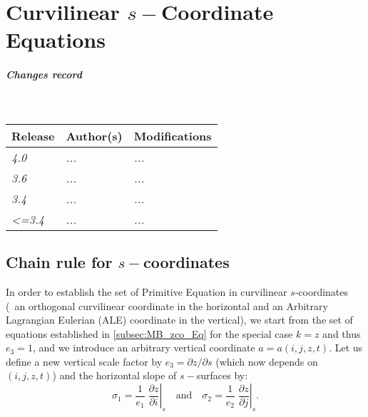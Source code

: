 \documentclass[../main/NEMO_manual]{subfiles}
\begin{document}
\chapter{Curvilinear $s-$Coordinate Equations}
\label{apdx:SCOORD}


\chaptertoc

\paragraph{Changes record} ~\\

{\footnotesize
  \begin{tabularx}{\textwidth}{l||X|X}
    Release & Author(s) & Modifications \\
    \hline
    {\em   4.0} & {\em ...} & {\em ...} \\
    {\em   3.6} & {\em ...} & {\em ...} \\
    {\em   3.4} & {\em ...} & {\em ...} \\
    {\em <=3.4} & {\em ...} & {\em ...}
  \end{tabularx}
}

\clearpage

\section{Chain rule for $s-$coordinates}
\label{sec:SCOORD_chain}

In order to establish the set of Primitive Equation in curvilinear $s$-coordinates
(\ie\ an orthogonal curvilinear coordinate in the horizontal and
an Arbitrary Lagrangian Eulerian (ALE) coordinate in the vertical),
we start from the set of equations established in \autoref{subsec:MB_zco_Eq} for
the special case $k = z$ and thus $e_3 = 1$,
and we introduce an arbitrary vertical coordinate $a = a(i,j,z,t)$.
Let us define a new vertical scale factor by $e_3 = \partial z / \partial s$ (which now depends on $(i,j,z,t)$) and
the horizontal slope of $s-$surfaces by:
\begin{equation}
  \label{eq:SCOORD_s_slope}
  \sigma_1 =\frac{1}{e_1 } \; \left. {\frac{\partial z}{\partial i}} \right|_s
  \quad \text{and} \quad
  \sigma_2 =\frac{1}{e_2 } \; \left. {\frac{\partial z}{\partial j}} \right|_s .
\end{equation}
\end{document}

